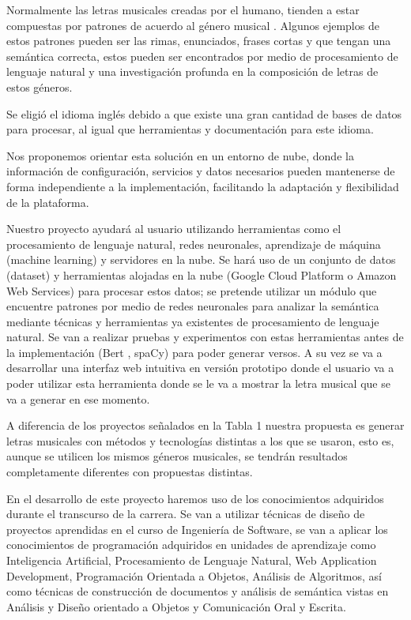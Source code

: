 \documentclass[12pt, a4paper, titlepage]{report}
\begin{document}
    	Normalmente las letras musicales creadas por el humano, tienden a estar compuestas por patrones de acuerdo al género musical \cite{genero_musical_en_la_musica_popular}. Algunos ejemplos de estos patrones pueden ser las rimas, enunciados, frases cortas y que tengan una semántica correcta, estos pueden ser encontrados por medio de procesamiento de lenguaje natural y una investigación profunda en la composición de letras de estos géneros.
    	
    	Se eligió el idioma inglés debido a que existe una gran cantidad de bases de datos para procesar, al igual que herramientas y documentación para este idioma.
    	
    	Nos proponemos orientar esta solución en un entorno de nube, donde la información de configuración, servicios y datos necesarios pueden mantenerse de forma independiente a la implementación, facilitando la adaptación y flexibilidad de la plataforma.
    	
    	Nuestro proyecto ayudará al usuario utilizando herramientas como el procesamiento de lenguaje natural, redes neuronales, aprendizaje de máquina (machine learning) y servidores en la nube. Se hará uso de un conjunto de datos (dataset) y herramientas alojadas en la nube (Google Cloud Platform o Amazon Web Services) para procesar estos datos; se pretende utilizar un módulo que encuentre patrones por medio de redes neuronales para analizar la semántica mediante técnicas y herramientas ya existentes de procesamiento de lenguaje natural. Se van a realizar pruebas y experimentos con estas herramientas antes de la implementación (Bert \cite{Bert}, spaCy\cite{spaCy}) para poder generar versos. A su vez se va a desarrollar una interfaz web intuitiva en versión prototipo donde el usuario va a poder utilizar esta herramienta donde se le va a mostrar la letra musical que se va a generar en ese momento.
    	
    	A diferencia de los proyectos señalados en la Tabla 1 nuestra propuesta es generar letras musicales con métodos y tecnologías distintas a los que se usaron, esto es, aunque se utilicen los mismos géneros musicales, se tendrán resultados completamente diferentes con propuestas distintas.
    	
    	En el desarrollo de este proyecto haremos uso de los conocimientos adquiridos durante el transcurso de la carrera. Se van a utilizar técnicas de diseño de proyectos aprendidas en el curso de Ingeniería de Software, se van a aplicar los conocimientos de programación adquiridos en unidades de aprendizaje como Inteligencia Artificial, Procesamiento de Lenguaje Natural, Web Application Development, Programación Orientada a Objetos, Análisis de Algoritmos, así como técnicas de construcción de documentos y análisis de semántica vistas en Análisis y Diseño orientado a Objetos y Comunicación Oral y Escrita.
    	
\end{document}
